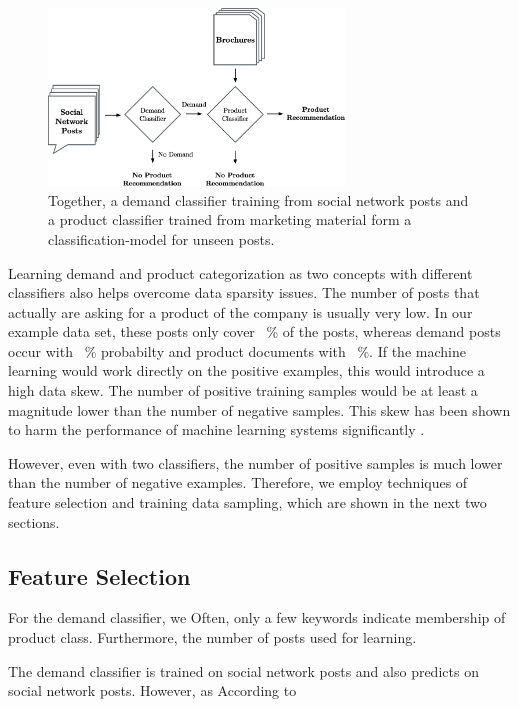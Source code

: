 \begin{figure}
	\label{fig:workflow}
	\begin{center}
		\includegraphics[width=0.7\textwidth]{figures/nto_workflow.eps}
	\end{center}
	\caption{Together, a demand classifier training from social network posts and a product classifier trained from marketing material form a classification-model for unseen posts.}
\end{figure}

Learning demand and product categorization as two concepts with different classifiers also helps overcome data sparsity issues.
The number of posts that actually are asking for a product of the company is usually very low.
In our example data set, these posts only cover ~\% of the posts, whereas demand posts occur with ~\% probabilty and product documents with ~\%.
If the machine learning would work directly on the positive examples, this would introduce a high data skew.
The number of positive training samples would be at least a magnitude lower than the number of negative samples.
This skew has been shown to harm the performance of machine learning systems significantly \cite{monard2002learning, guo2008class}.

However, even with two classifiers, the number of positive samples is much lower than the number of negative examples.
Therefore, we employ techniques of feature selection and training data sampling, which are shown in the next two sections.

\subsection{Feature Selection}
For the demand classifier, we 
Often, only a few keywords indicate membership of product class.
Furthermore, the number of posts used for learning.


The demand classifier is trained on social network posts and also predicts on social network posts.
However, as 
According to 


